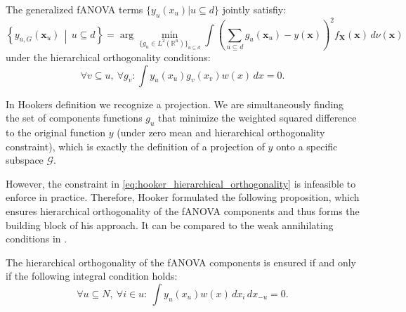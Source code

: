 The generalized fANOVA terms $\{y_u(x_u) | u \subseteq d \}$ jointly satisfiy:
\begin{equation}
\left\{ y_{u, G}(\boldsymbol{x}_u) \,\middle|\, u \subseteq d \right\}
= \arg\min_{\{g_u \in L^2(\mathbb{R}^u)\}_{u \subseteq d}} 
\int \left( \sum_{u \subseteq d} g_u(\boldsymbol{x}_u) - y(\boldsymbol{x}) \right)^2 f_{\boldsymbol{X}}(\boldsymbol{x}) \, d \nu (\boldsymbol{x})
\label{eq:generalized_fanova_components_hooker}
\end{equation}
under the hierarchical orthogonality conditions:
\begin{equation}
    \forall v \subseteq u,\ \forall g_v : \int y_u(x_u) g_v(x_v) w(x) \, dx = 0. \tag{4.2}
\label{eq:hooker_hierarchical_orthogonality}
\end{equation}

In Hookers definition we recognize a projection. We are simultaneously finding the set of components functions $g_u$ that minimize the weighted squared difference to the original function $y$ (under zero mean and hierarchical orthogonality constraint), which is exactly the definition of a projection of $y$ onto a specific subspace $\mathcal{G}$.\par

However, the constraint in \autoref{eq:hooker_hierarchical_orthogonality} is infeasible to enforce in practice. 
Therefore, Hooker formulated the following proposition, which ensures hierarchical orthogonality of the fANOVA components and thus forms the building block of his approach. It can be compared to the weak annihilating conditions in \cite{rahman2014}.
\begin{proposition}
    The hierarchical orthogonality of the fANOVA components is ensured if and only if the following integral condition holds:
    \begin{equation}
\forall u \subseteq N,\ \forall i \in u:\ \int y_u(x_u) w(x)\, dx_i\, dx_{-u} = 0.
\tag{4.3}
\end{equation}
\label{proposition:hooker_hierarchical_orthogonality}
\end{proposition}

